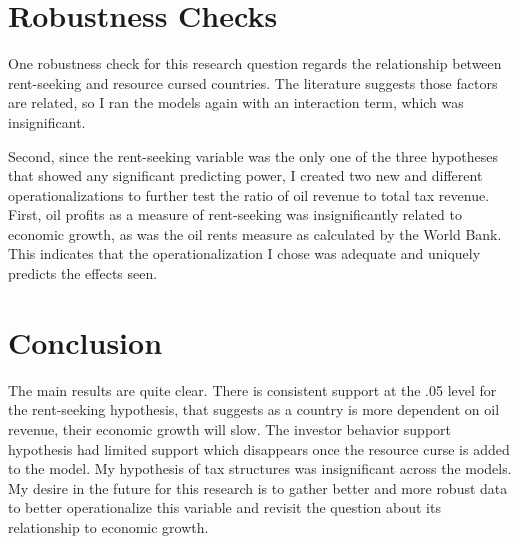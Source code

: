 \documentclass[12pt]{report}   	%
\begin{document}
\section*{Robustness Checks}
One robustness check for this research question regards the relationship between rent-seeking and resource cursed countries. The literature suggests those factors are related, so I ran the models again with an interaction term, which was insignificant. 

Second, since the rent-seeking variable was the only one of the three hypotheses that showed any significant predicting power, I created two new and different operationalizations to further test the ratio of oil revenue to total tax revenue. First, oil profits as a measure of rent-seeking was insignificantly related to economic growth, as was the oil rents measure as calculated by the World Bank. This indicates that the operationalization I chose was adequate and uniquely predicts the effects seen.

\section*{Conclusion}

The main results are quite clear. There is consistent support at the .05 level for the rent-seeking hypothesis, that suggests as a country is more dependent on oil revenue, their economic growth will slow. The investor behavior support hypothesis had limited support which disappears once the resource curse is added to the model. My hypothesis of tax structures was insignificant across the models. My desire in the future for this research is to gather better and more robust data to better operationalize this variable and revisit the question about its relationship to economic growth.
\end{document}
